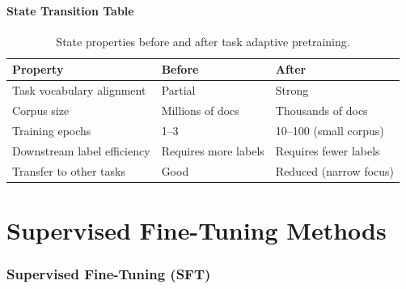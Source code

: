 \documentclass{article}
\begin{document}
\subsection{State Transition Table}
\begin{table}[h]\centering
\begin{tabular}{lll}\toprule
\textbf{Property} & \textbf{Before} & \textbf{After}\\\midrule
Task vocabulary alignment & Partial & Strong\\
Corpus size & Millions of docs & Thousands of docs\\
Training epochs & 1--3 & 10--100 (small corpus)\\
Downstream label efficiency & Requires more labels & Requires fewer labels\\
Transfer to other tasks & Good & Reduced (narrow focus)\\\bottomrule
\end{tabular}
\caption{State properties before and after task adaptive pretraining.}
\end{table}

\newpage
\part{Supervised Fine-Tuning Methods}

\section{Supervised Fine-Tuning (SFT)}
\end{document}
